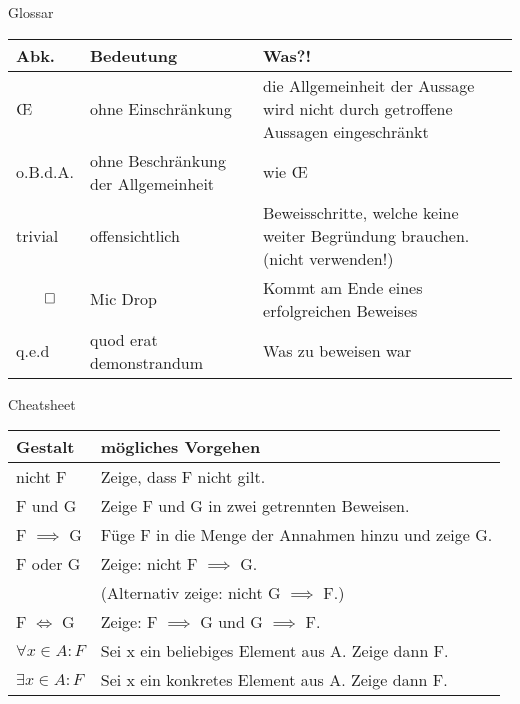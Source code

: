 \begin{frame}[fragile]{Glossar}
    \small
    \begin{tabular}{p{} p{} p{}}
    \toprule
    Abk.&Bedeutung&Was?!\\
    \midrule
        \OE & ohne Einschränkung & die Allgemeinheit der Aussage wird nicht durch getroffene Aussagen eingeschränkt\\
        o.B.d.A. & ohne Beschränkung der Allgemeinheit & wie \OE\\
        trivial&offensichtlich&Beweisschritte, welche keine weiter Begründung brauchen. (nicht verwenden!)\\
        $\qed$&Mic Drop&Kommt am Ende eines erfolgreichen Beweises\\
        q.e.d&quod erat demonstrandum&Was zu beweisen war\\
    \bottomrule
    \end{tabular}
\end{frame}

 \begin{frame}[fragile]{Cheatsheet}
     \small
     \begin{tabular}{p{} p{}}
     \toprule
     Gestalt&mögliches Vorgehen\\
     \midrule
         nicht F&Zeige, dass F nicht gilt.\\
         F und G&Zeige F und G in zwei getrennten Beweisen.\\
         F $\implies$ G&Füge F in die Menge der Annahmen hinzu und zeige G.\\
         F oder G&Zeige: nicht F $\implies$ G. \\&(Alternativ zeige: nicht G $\implies$ F.)\\
         F $\iff$ G&Zeige: F $\implies$ G und G $\implies$ F.\\
         $\forall x \in A : F$&Sei x ein beliebiges Element aus A. Zeige dann F.\\
         $\exists x \in A : F$&Sei x ein konkretes Element aus A. Zeige dann F.\\
     \bottomrule
     \end{tabular}
 \end{frame}

